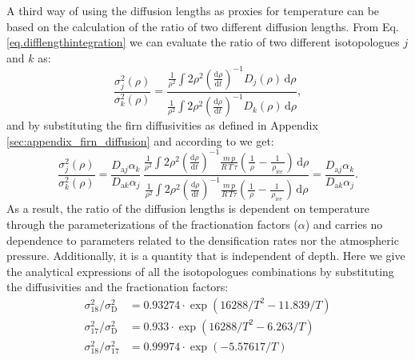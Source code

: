 \documentclass[11pt, draftcls, onecolumn]{IEEEtran} %
\numberwithin{equation}{section}
\numberwithin{table}{section}
\numberwithin{figure}{section}
\begin{document}
A third way of using the diffusion lengths as proxies for temperature can be based on the calculation 
of the ratio of two different diffusion lengths. From Eq. \ref{eq.difflengthintegration} we can evaluate the ratio 
of two different isotopologues $j$ and $k$ as:
\begin{equation}
\frac{\sigma_j^2 \left( \rho \right)}{\sigma_k^2 \left( \rho \right)} = \frac{\displaystyle \frac{\,1\,}{\rho^2} \int 2\rho^2 
{\left( \frac{\mathrm{d}\rho}{\mathrm{d}t}\right)}^{-1}\! D_j \!\left( \rho \right) \,\mathrm{d}\rho}
{\displaystyle  \frac{\,1\,}{\rho^2} \displaystyle \int2\rho^2 
{\left( \frac{\mathrm{d}\rho}{\mathrm{d}t}\right)}^{-1}\! D_k \!\left( \rho \right) \,\mathrm{d}\rho},
\label{eq.difflengthratio}
\end{equation}
and by substituting the firn diffusivities as defined in Appendix \ref{sec:appendix_firn_diffusion} and according to 
\cite{Johnsen2000} we get:
\begin{equation}
 \frac{\sigma_j^2 \left( \rho \right)}{\sigma_k^2 \left( \rho \right)} = 
\frac{D_{\mathrm{a}j} \alpha_k}{D_{\mathrm{a}k} \alpha_j}\,
\frac{\displaystyle \frac{\,1\,}{\rho^2} \int 2\rho^2 
{\left( \frac{\mathrm{d}\rho}{\mathrm{d}t}\right)}^{-1}\!  \frac{m\,p}{R\,T\,\tau}
\left(\frac{\,1\,}{\,\rho\,} - \frac{\,1\,}{\,\rho_{\mathrm{ice}}\,}\right) \,\mathrm{d}\rho}
{\displaystyle \frac{\,1\,}{\rho^2}  \int2\rho^2 
{\left( \frac{\mathrm{d}\rho}{\mathrm{d}t}\right)}^{-1}\!  \frac{m\,p}{R\,T\tau}
\left(\frac{\,1\,}{\,\rho\,} - \frac{\,1\,}{\,\rho_{\mathrm{ice}}\,}\right) \,\mathrm{d}\rho} = 
\frac{D_{\mathrm{a}j} \alpha_k}{D_{\mathrm{a}k} \alpha_j}.
\label{eq.difflengthratio_b}
\end{equation}
As a result, the ratio of the diffusion lengths is dependent on temperature through the parameterizations
of the fractionation factors ($\alpha$) and carries no dependence to parameters related to the densification rates nor the 
atmospheric pressure. Additionally, it is a quantity that is independent of depth.
Here we give the analytical expressions of all the isotopologues combinations by substituting the diffusivities and the fractionation
factors:
\begin{align}
\sigma^2_{18}/\sigma^2_{\mathrm{D}} & = 0.93274\cdot \exp(16288/T^2-11.839/T)\\
\sigma^2_{17}/\sigma^2_{\mathrm{D}} & = 0.933\cdot \exp(16288/T^2-6.263/T)\\
\sigma^2_{18}/\sigma^2_{17} & = 0.99974\cdot \exp(-5.57617/T)
\label{eq.difflengthratio_c}
\end{align}
\end{document}
